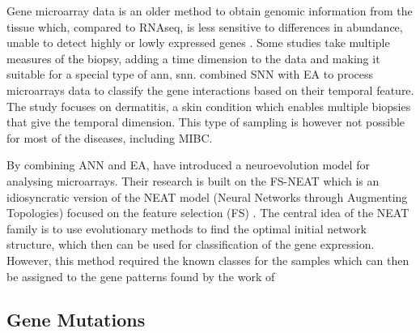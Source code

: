 Gene microarray data is an older method to obtain genomic information from the tissue which, compared to RNAseq, is less sensitive to differences in abundance, unable to detect highly or lowly expressed genes \citep{Wang2009-lj}. Some studies take multiple measures of the biopsy, adding a time dimension to the data and making it suitable for a special type of \acrfull{ann}, \acrfull{snn}. \citet{Capecci2020-uj} combined SNN with EA to process microarrays data to classify the gene interactions based on their temporal feature. The study focuses on dermatitis, a skin condition which enables multiple biopsies that give the temporal dimension. This type of sampling is however not possible for most of the diseases, including MIBC.

By combining ANN and EA, \citet{Grisci2019-xn} have introduced a neuroevolution model for analysing microarrays. Their research is built on the FS-NEAT \citep{Whiteson2005-dn} which is an idiosyncratic version of the NEAT model (Neural Networks through Augmenting Topologies) focused on the feature selection (FS) \citep{Stanley2002-tg}. The central idea of the NEAT family is to use evolutionary methods to find the optimal initial network structure, which then can be used for classification of the gene expression. However, this method required the known classes for the samples which can then be assigned to the gene patterns found by the work of \citep{Grisci2019-xn}

\subsection{Gene Mutations} \label{s:lit:mutations}

\vspace{3mm}
\vspace{3mm}


